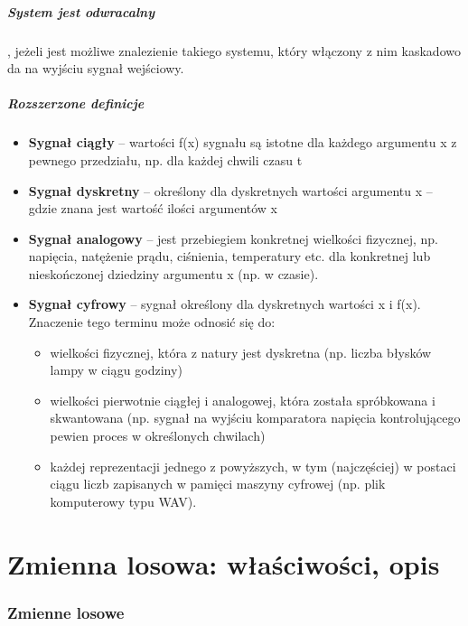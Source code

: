 \documentclass[a4paper,twoside]{report}
\begin{document}
\paragraph{System jest odwracalny}, jeżeli jest możliwe znalezienie takiego systemu, który włączony z nim kaskadowo da na wyjściu sygnał wejściowy.

\paragraph{Rozszerzone definicje}
\begin{itemize}
\item \textbf{Sygnał ciągły} – wartości f(x) sygnału są istotne dla każdego argumentu x z pewnego przedziału, np. dla każdej chwili czasu t 
\item \textbf{Sygnał dyskretny} – określony dla dyskretnych wartości argumentu x – gdzie znana jest wartość ilości argumentów x 
\item \textbf{Sygnał analogowy} – jest przebiegiem konkretnej wielkości fizycznej, np. napięcia, natężenie prądu, ciśnienia, temperatury etc. dla konkretnej lub nieskończonej dziedziny argumentu x (np. w czasie). 
\item \textbf{Sygnał cyfrowy} – sygnał określony dla dyskretnych wartości x i f(x). Znaczenie tego terminu może odnosić się do: 
\begin{itemize}
\item wielkości fizycznej, która z natury jest dyskretna (np. liczba błysków lampy w ciągu godziny) 
\item wielkości pierwotnie ciągłej i analogowej, która została spróbkowana i skwantowana (np. sygnał na wyjściu komparatora napięcia kontrolującego pewien proces w określonych chwilach) 
\item każdej reprezentacji jednego z powyższych, w tym (najczęściej) w postaci ciągu liczb zapisanych w pamięci maszyny cyfrowej (np. plik komputerowy typu WAV). 
\end{itemize}
\end{itemize}

\chapter{Zmienna losowa: właściwości, opis}

\subsection{Zmienne losowe}
\end{document}
